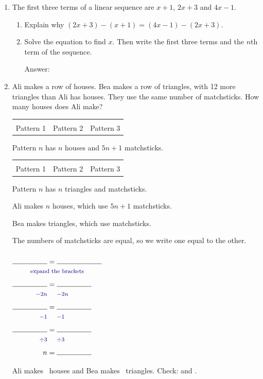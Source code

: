 \documentclass[11pt,a4paper]{article}
\makeatletter
\newcommand{\gap}{\underline{\hspace{0.95cm}}}
\newcommand{\ansline}[1][2.2cm]{\underline{\hspace{#1}}}
\newcommand{\workspace}[1]{\par\vspace{#1}\hfill Answer: \ansline[3.5cm]\par}
\newenvironment{working}
  {\(\renewcommand{\arraystretch}{1.06}\begin{array}{@{}r@{\;}c@{\;}l@{}}}
  {\end{array}\)}
\newcommand{\opstyle}[1]{\text{\footnotesize\color{blue!55!black}$#1$}}
\newcommand{\bsop}[1]{\opstyle{#1} & & \opstyle{#1}\\}
\newcommand{\bsnote}[1]{\multicolumn{3}{c}{\text{\footnotesize\color{blue!55!black}#1}}\\}
\newcommand{\sidegap}[1][1.7cm]{\rule{0pt}{5.3mm}\rule{#1}{0.4pt}}
\newcommand{\eqlayout}[4]{%
  \begin{minipage}[c]{#1\linewidth}\raggedright #2\end{minipage}\hfill
  \begin{minipage}[c]{\dimexpr0.98\linewidth-#1\linewidth\relax}\centering #3\end{minipage}\par\smallskip
  #4}
\newcommand{\pic}[1]{\begin{tikzpicture}[baseline=(current bounding box.south)]#1\end{tikzpicture}}
\newcommand{\stick}[2]{\draw[stick] (#1) -- (#2);}
\newcommand{\housegroup}[1]{%
  \stick{0.5*#1-0.5,0}{0.5*#1,0}\stick{0.5*#1-0.5,0.5}{0.5*#1,0.5}
  \stick{0.5*#1,0}{0.5*#1,0.5}
  \stick{0.5*#1-0.5,0.5}{0.5*#1-0.25,0.79}\stick{0.5*#1-0.25,0.79}{0.5*#1,0.5}}
\newcommand{\chainhouses}[1]{\pic{%
  \stick{0,0}{0,0.5}
  \foreach \k in {1,...,#1} {\housegroup{\k}}}}
\newcommand{\chaintriangles}[1]{\pic{%
  \stick{0,0}{0.29,0.5}
  \foreach \k in {1,...,#1} {
    \ifodd\k\relax
      \stick{0.29*\k-0.29,0}{0.29*\k+0.29,0}\stick{0.29*\k,0.5}{0.29*\k+0.29,0}
    \else
      \stick{0.29*\k-0.29,0.5}{0.29*\k+0.29,0.5}\stick{0.29*\k+0.29,0.5}{0.29*\k,0}
    \fi}}}
\newcommand{\threepatterns}[3]{%
  \begin{tabular}{@{}c@{\hspace{10pt}}c@{\hspace{10pt}}c@{}}
    #1 & #2 & #3\\[-1pt]
    {\scriptsize Pattern 1} & {\scriptsize Pattern 2} & {\scriptsize Pattern 3}
  \end{tabular}}
\makeatother
\begin{document}
\begin{enumerate}[resume]
\newpage
\item The first three terms of a linear sequence are $x+1$, $2x+3$ and $4x-1$.
\begin{enumerate}
\item Explain why $(2x+3)-(x+1)=(4x-1)-(2x+3)$. \hrulefill
\item Solve the equation to find $x$. Then write the first three terms and the
  $n$th term of the sequence.
  \workspace{1.8cm}
\end{enumerate}

\item Ali makes a row of houses. Bea makes a row of triangles, with 12 more triangles
than Ali has houses. They use the same number of matchsticks. How many houses does
Ali make?\par\smallskip
\begin{minipage}[t]{0.49\linewidth}\centering
  \threepatterns{\chainhouses{1}}{\chainhouses{2}}{\chainhouses{3}}\par
  {\small Pattern $n$ has $n$ houses and $5n+1$ matchsticks.}
\end{minipage}\hfill
\begin{minipage}[t]{0.49\linewidth}\centering
  \threepatterns{\chaintriangles{1}}{\chaintriangles{2}}{\chaintriangles{3}}\par
  {\small Pattern $n$ has $n$ triangles and \ansline[1.4cm] matchsticks.}
\end{minipage}\par\medskip
\eqlayout{0.6}
  {Ali makes $n$ houses, which use $5n+1$ matchsticks.\par\smallskip
   Bea makes \ansline[1.1cm] triangles, which use \ansline[1.9cm] matchsticks.\par\smallskip
   The numbers of matchsticks are equal, so we write one equal to the other.}
  {\begin{working}
     \sidegap & = & \sidegap[2.2cm]\\ \bsnote{expand the brackets}
     \sidegap & = & \sidegap\\ \bsop{-2n}
     \sidegap & = & \sidegap\\ \bsop{-1}
     \sidegap & = & \sidegap\\ \bsop{\div 3}
     n & = & \sidegap
   \end{working}}
  {Ali makes \gap\ houses and Bea makes \gap\ triangles. Check: \ansline[2.9cm] and \ansline[2.9cm].}


\end{enumerate}
\end{document}
